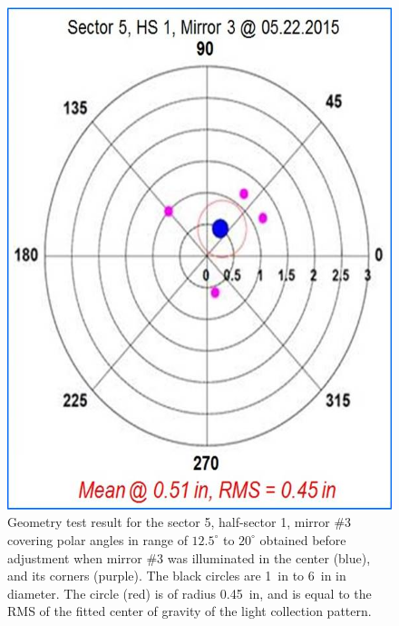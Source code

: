 \begin{figure}[ht]
    \centering
    \includegraphics[width=1.0\linewidth,trim={0 0cm 0 0},clip]{images/Ch_5_1_3_Before_NEW.jpg}
    \caption{Geometry test result for the sector 5, half-sector 1, mirror \#3 covering polar angles in range of
      $12.5^\circ$ to $20^\circ$ obtained before adjustment when mirror \#3 was illuminated in the center (blue),
      and its corners (purple). The black circles are 1~in to 6~in in diameter. The circle (red) is of radius 0.45~in,
      and is equal to the RMS of the fitted center of gravity of the light collection pattern.}
    \label{fig:Ch_5_1_3_Before_NEW}
\end{figure}


